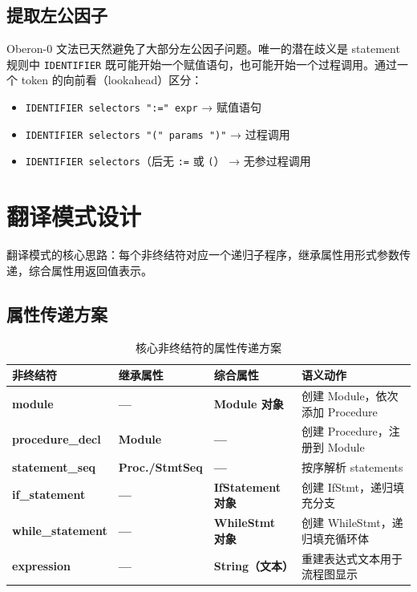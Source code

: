 \documentclass[12pt,a4paper,fontset=none]{ctexart}
\begin{document}
\subsection{提取左公因子}

Oberon-0 文法已天然避免了大部分左公因子问题。唯一的潜在歧义是 statement 规则中 \texttt{IDENTIFIER} 既可能开始一个赋值语句，也可能开始一个过程调用。通过一个 token 的向前看（lookahead）区分：

\begin{itemize}
  \item \texttt{IDENTIFIER selectors ":=" expr} → 赋值语句
  \item \texttt{IDENTIFIER selectors "(" params ")"} → 过程调用
  \item \texttt{IDENTIFIER selectors}（后无 \texttt{:=} 或 \texttt{(}） → 无参过程调用
\end{itemize}

\section{翻译模式设计}

翻译模式的核心思路：每个非终结符对应一个递归子程序，继承属性用形式参数传递，综合属性用返回值表示。

\subsection{属性传递方案}

\begin{table}[H]\centering
\footnotesize
\setlength{\tabcolsep}{3pt}
\begin{tabularx}{\textwidth}{>{\bfseries}P{3cm}>{\bfseries}P{2.3cm}>{\bfseries}P{2cm}>{\raggedright\arraybackslash}X}
\toprule
非终结符 & 继承属性 & 综合属性 & 语义动作 \\
\midrule
module & — & Module 对象 & 创建 Module，依次添加 Procedure \\
procedure\_decl & Module & — & 创建 Procedure，注册到 Module \\
statement\_seq & Proc./StmtSeq & — & 按序解析 statements \\
if\_statement & — & IfStatement 对象 & 创建 IfStmt，递归填充分支 \\
while\_statement & — & WhileStmt 对象 & 创建 WhileStmt，递归填充循环体 \\
expression & — & String（文本） & 重建表达式文本用于流程图显示 \\
\bottomrule
\end{tabularx}
\caption{核心非终结符的属性传递方案}
\end{table}
\end{document}
